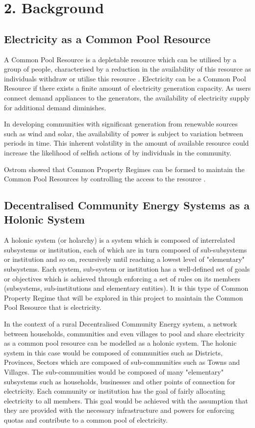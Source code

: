\chapter{2. Background}
\label{Background}

\section*{Electricity as a Common Pool Resource}
A Common Pool Resource is a depletable resource which can be utilised by a group of people, characterised by a reduction in the availability of this resource as individuals withdraw or utilise this resource \cite{Ostrom:90}.  Electricity can be a Common Pool Resource if there exists a finite amount of electricity generation capacity. As users connect demand appliances to the generators, the availability of electricity supply for additional demand diminishes.

In developing communities with significant generation from renewable sources such as wind and solar, the availability of power is subject to variation between periods in time. This inherent volatility in the amount of available resource could increase the likelihood of selfish actions of by individuals in the community.

Ostrom showed that Common Property Regimes can be formed to maintain the Common Pool Resources by controlling the access to the resource \cite{Ostrom:90}. 

\section*{Decentralised Community Energy Systems as a Holonic System}
A holonic system (or holarchy) is a system which is composed of interrelated subsystems or institution, each of which are in turn composed of sub-subsystems  or institution and so on, recursively until reaching a lowest level of "elementary" subsystems. Each system, sub-system or institution has a well-defined set of goals or objectives which is achieved through enforcing a set of rules on its members (subsystems, sub-institutions and elementary entities)\cite{Pitt:Holonic_Institutions}. It is this type of Common Property Regime that will be explored in this project to maintain the Common Pool Resource that is electricity. 

In the context of a rural Decentralised Community Energy system, a network between households, communities and even villages to pool and share electricity as a common pool resource can be modelled as a holonic system. The holonic system in this case would be composed of communities such as Districts, Provinces, Sectors which are composed of sub-communities such as Towns and Villages. The sub-communities would be composed of many "elementary" subsystems such as households, businesses and other points of connection for electricity. Each community or institution has the goal of fairly allocating electricity to all members. This goal would be achieved with the assumption that they are provided with the necessary infrastructure and powers for enforcing quotas and contribute to a common pool of electricity.

